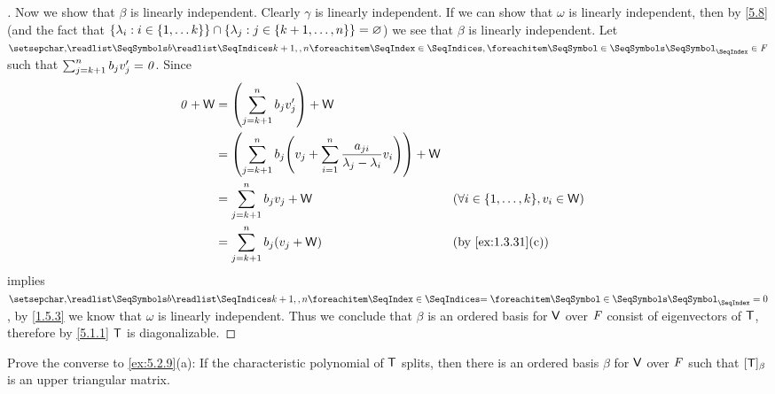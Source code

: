 \begin{proof}[]
	Now we show that \(\beta\) is linearly independent.
	Clearly \(\gamma\) is linearly independent.
	If we can show that \(\omega\) is linearly independent, then by \cref{5.8} (and the fact that \(\left\lbrace\lambda_i : i \in \left\lbrace1, \dots k\right\rbrace\right\rbrace \cap \left\lbrace\lambda_j : j \in \left\lbrace k + 1, \dots, n\right\rbrace\right\rbrace = \varnothing\)) we see that \(\beta\) is linearly independent.
	Let \(\seq{b}{k+1,,n} \in \F\) such that \(\sum_{j = k + 1}^n b_j v_j' = \mathit{0}\).
	Since
	\begin{align*}
		\zv + \W & = \pa{\sum_{j = k + 1}^n b_j v_j'} + \W                                                                                                                   \\
		         & = \pa{\sum_{j = k + 1}^n b_j \pa{v_j + \sum_{i = 1}^n \frac{a_{j i}}{\lambda_j - \lambda_i} v_i}} + \W                                                    \\
		         & = \sum_{j = k + 1}^n b_j v_j + \W                                                                      &  & (\forall i \in \set{1, \dots, k}, v_i \in \W) \\
		         & = \sum_{j = k + 1}^n b_j (v_j + \W)                                                                    &  & \by{ex:1.3.31}[c]
	\end{align*}
	implies \(\seq[=]{b}{k+1,,n} = 0\), by \cref{1.5.3} we know that \(\omega\) is linearly independent.
	Thus we conclude that \(\beta\) is an ordered basis for \(\mathsf{V}\) over \(\mathit{F}\) consist of eigenvectors of \(\mathsf{T}\), therefore by \cref{5.1.1} \(\mathsf{T}\) is diagonalizable.
\end{proof}

\setcounter{ex}{31}
\begin{ex}\label{ex:5.4.32}
	Prove the converse to \cref{ex:5.2.9}(a):
	If the characteristic polynomial of \(\mathsf{T}\) splits, then there is an ordered basis \(\beta\) for \(\mathsf{V}\) over \(\mathit{F}\) such that \([\mathsf{T}]_{\beta}\) is an upper triangular matrix.
\end{ex}

